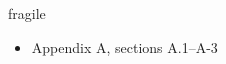 


\begin{frame}{fragile}
    \begin{itemize}
    \item Appendix A, sections A.1--A-3%
    \end{itemize}
\end{frame}


